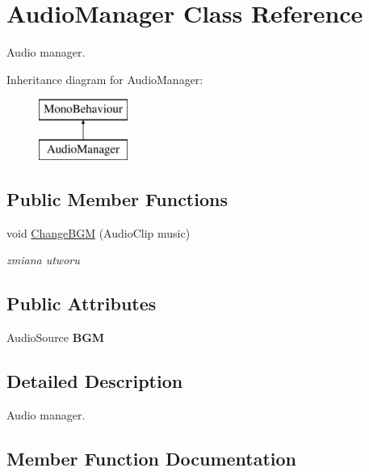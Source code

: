 \hypertarget{class_audio_manager}{}\section{Audio\+Manager Class Reference}
\label{class_audio_manager}


Audio manager.  


Inheritance diagram for Audio\+Manager\+:\begin{figure}[H]
\begin{center}
\leavevmode
\includegraphics[height=2.000000cm]{class_audio_manager}
\end{center}
\end{figure}
\subsection*{Public Member Functions}
\begin{DoxyCompactItemize}
\item 
void \hyperlink{class_audio_manager_af2945459043f0a7f3f58f808903f587e}{Change\+B\+GM} (Audio\+Clip music)
\begin{DoxyCompactList}\small\item\em zmiana utworu \end{DoxyCompactList}\end{DoxyCompactItemize}
\subsection*{Public Attributes}
\begin{DoxyCompactItemize}
\item 
\mbox{\label{class_audio_manager_a4a0d8e7375e1dcce42f53eb05bb8857b}} 
Audio\+Source {\bfseries B\+GM}
\end{DoxyCompactItemize}


\subsection{Detailed Description}
Audio manager. 



\subsection{Member Function Documentation}
\mbox{\label{class_audio_manager_af2945459043f0a7f3f58f808903f587e}} 
